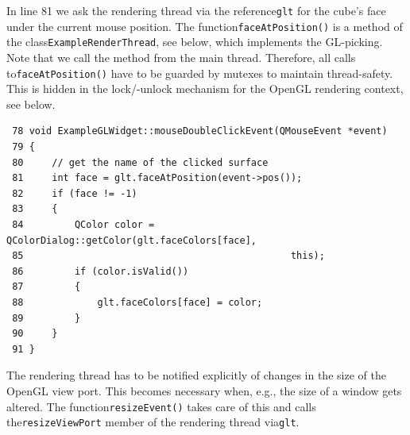 \documentclass[prodmode,acmtopc]{acmsmall}
\begin{document}
In line 81 we ask the rendering thread via the reference\lstinline|glt| for the
cube's face under the current mouse position.
%
The function\lstinline|faceAtPosition()| is a method of the
class\lstinline|ExampleRenderThread|, see below, which implements the
GL-picking.
%
Note that we call the method from the main thread.
%
Therefore, all calls to\lstinline|faceAtPosition()| have to be guarded by
mutexes to maintain thread-safety.
%
This is hidden in the lock/-unlock mechanism for the OpenGL rendering context,
see below.
\begin{lstlisting}
 78 void ExampleGLWidget::mouseDoubleClickEvent(QMouseEvent *event)
 79 {
 80     // get the name of the clicked surface
 81     int face = glt.faceAtPosition(event->pos());
 82     if (face != -1)
 83     {
 84         QColor color = QColorDialog::getColor(glt.faceColors[face],
 85                                               this);
 86         if (color.isValid())
 87         {
 88             glt.faceColors[face] = color;
 89         }
 90     }
 91 }
\end{lstlisting}
%
%
The rendering thread has to be notified explicitly of changes in the size of
the OpenGL view port.
%
%
This becomes necessary when, e.g., the size of a window gets altered.
%
The function\lstinline|resizeEvent()| takes care of this and calls
the\lstinline|resizeViewPort| member of the rendering thread
via\lstinline|glt|.
\end{document}
